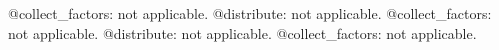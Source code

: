 \documentclass[11pt]{article}
\begin{document}
@collect\_factors: not applicable.
@distribute: not applicable.
@collect\_factors: not applicable.
@distribute: not applicable.
@collect\_factors: not applicable.
\end{document}
